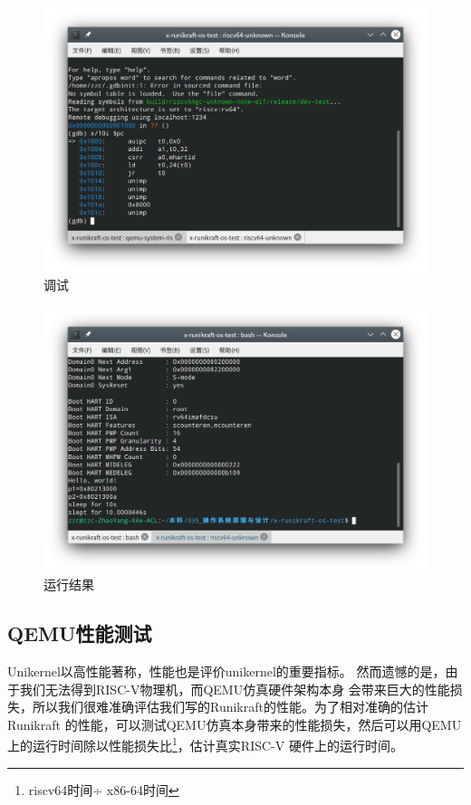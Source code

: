 \documentclass[UTF8,fontset=none,linespread=1.15]{ctexart}
\begin{document}
\begin{figure}[tbh!]
\centering
\includegraphics[width=0.9\linewidth]{assets/debug}
\caption{调试}
\label{fig:debug}
\end{figure}

\begin{figure}[tbh!]
\centering
\includegraphics[width=0.9\linewidth]{assets/run}
\caption{运行结果}
\label{fig:run}
\end{figure}

\subsection{QEMU性能测试}
Unikernel以高性能著称，性能也是评价unikernel的重要指标。
然而遗憾的是，由于我们无法得到RISC-V物理机，而QEMU仿真硬件架构本身
会带来巨大的性能损失，所以我们很难准确评估我们写的Runikraft的性能。为了相对准确的估计Runikraft
的性能，可以测试QEMU仿真本身带来的性能损失，然后可以用QEMU上的运行时间除以性能损失比\footnote{riscv64时间÷ x86-64时间}，估计真实RISC-V
硬件上的运行时间。
\end{document}
